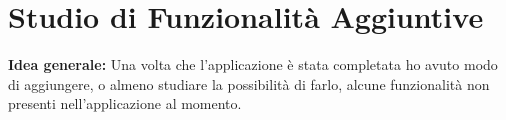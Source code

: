 \chapter{Studio di Funzionalità Aggiuntive}
\textbf{Idea generale:} Una volta che l'applicazione è stata completata ho avuto modo di aggiungere, o almeno studiare la possibilità di farlo, alcune funzionalità non presenti nell'applicazione al momento. 